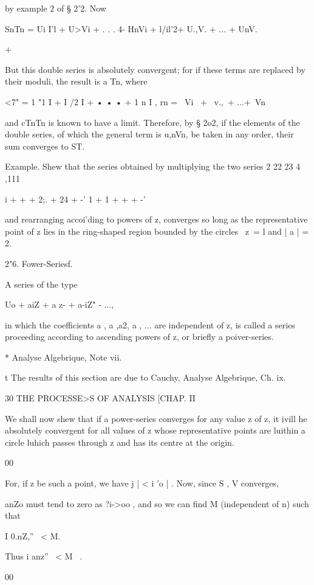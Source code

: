 by example 2 of § 2'2. Now 

SnTn = Ui I'l + U>Vi + . . . 4- HnVi 
+ l/il'2+ U.,V.  + ... + UnV.  

+ 

But this double series is absolutely convergent; for if these terms are 
replaced by their moduli, the result is a Tn, where 

<7"  = 1 "1 I + I  /2 I + • • • + 1  n I , 
rn = \ Vi \ + \ v.,\ + ...+\ Vn\, 

and cTnTn is known to have a limit. Therefore, by § 2o2, if the elements of 
the double series, of which the general term is u,nVn, be taken in any order, 
their sum converges to ST. 

Example. Shew that the series obtained by multiplying the two series 
  2 22 23  4 ,111 

i +   +   + 2;. + 24 + -' 1 + 1 +   +   + -' 

and rearranging accoi'ding to powers of z, converges so long as the representative point of z 
lies in the ring-shaped region bounded by the circles \ z\ = l and | a | = 2. 

2"6. Fower-Seriesf. 

A series of the type 

Uo + aiZ + a z- + a-iZ" -  ..., 

in which the coefficients a , a ,a2, a , ... are independent of z, is called a series 
proceeding according to ascending powers of z, or briefly a poiver-series. 

* Analyse Algebrique, Note vii. 

t The results of this section are due to Cauchy, Analyse Algebrique, Ch. ix. 



  30 THE PROCESSE>S OF ANALYSIS [CHAP. II 

We shall now shew that if a power-series converges for any value z  of z, 
it ivill he absolutely convergent for all values of z whose representative points 
are luithin a circle luhich passes through z  and has its centre at the origin. 

00 

For, if z be such a point, we have j   | < i  'o | . Now, since S  ,  V  converges, 

anZo  must tend to zero as ?i->oo , and so we can find M (independent of n) 
such that 

I 0.nZ,'' \ < M. 

Thus i anz'' \ < M  \ . 

00 

